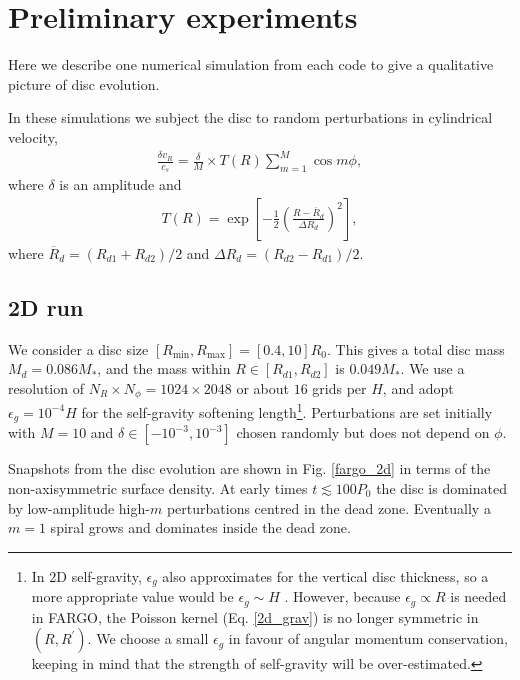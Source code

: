 \section{Preliminary experiments}
Here we describe one numerical simulation from each code to give a
qualitative picture of disc evolution. 

In these simulations we subject the disc to random perturbations in
cylindrical velocity,
\begin{align}\label{randpert}
  \frac{\delta v_R}{c_s} = \frac{\delta}{M}\times T(R) \sum_{m=1}^M\cos{m\phi},
\end{align}
where $\delta$ is an amplitude and 
\begin{align}
  T(R) =
  \exp{\left[-\frac{1}{2}\left(\frac{R-\overline{R}_d}{\Delta
          R_d}\right)^2\right]}, 
\end{align}
where $\overline{R}_d = (R_{d1}+R_{d2})/2$ and $\Delta R_d =
(R_{d2}-R_{d1})/2$. 
\subsection{2D run}\label{fargo_fiducial}
We consider a disc size $[R_\mathrm{min}, R_\mathrm{max}] =
[0.4,10]R_0$. This gives a total disc mass $M_{d}=0.086M_*$, and the
mass within $R\in[R_{d1},R_{d2}]$ is $0.049M_*$. 
We use a resolution of $N_R\times N_\phi = 1024\times 2048$ or
about $16$ grids per $H$, and adopt $\epsilon_g=10^{-4}H$ for the 
self-gravity softening length\footnote{In 2D self-gravity, $\epsilon_g$ also
  approximates for the vertical disc thickness, so a more appropriate
  value would be $\epsilon_g\sim H$ \citep{muller12}. However, because
  $\epsilon_g\propto R$ is needed in FARGO, the Poisson kernel
  (Eq. \ref{2d_grav}) is no longer symmetric in $(R,R^\prime)$. We
  choose a small  
  $\epsilon_g$ in favour of angular momentum conservation, keeping in
  mind that the strength of self-gravity will be over-estimated.}.
Perturbations are set initially with $M=10$ and
$\delta\in[-10^{-3},10^{-3}]$ chosen randomly but does not depend
on $\phi$. 


Snapshots from the disc evolution are shown in Fig. \ref{fargo_2d} in
terms of the non-axisymmetric surface density. At early times
$t\lesssim100P_0$ the disc is dominated by low-amplitude high-$m$
perturbations centred in the dead zone. Eventually a $m=1$ spiral 
grows and dominates inside the dead zone.  


